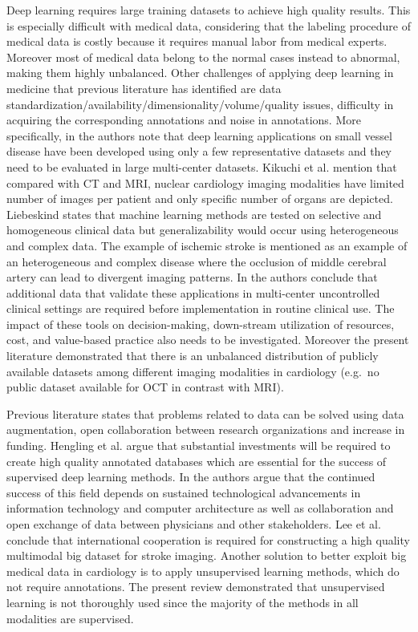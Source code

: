 \documentclass[journal]{IEEEtran}
\begin{document}
Deep learning requires large training datasets to achieve high quality results\cite{krizhevsky2012imagenet}.
This is especially difficult with medical data, considering that the labeling procedure of medical data is costly because it requires manual labor from medical experts.
Moreover most of medical data belong to the normal cases instead to abnormal, making them highly unbalanced.
Other challenges of applying deep learning in medicine that previous literature has identified are data standardization/availability/dimensionality/volume/quality issues, difficulty in acquiring the corresponding annotations and noise in annotations\cite{litjens2017survey, greenspan2016guest, miotto2017deep, slomka2017cardiac}.
More specifically, in\cite{blair2017advanced} the authors note that deep learning applications on small vessel disease have been developed using only a few representative datasets and they need to be evaluated in large multi-center datasets.
Kikuchi et al.\cite{kikuchi2018future} mention that compared with CT and MRI, nuclear cardiology imaging modalities have limited number of images per patient and only specific number of organs are depicted.
Liebeskind\cite{liebeskind2018artificial} states that machine learning methods are tested on selective and homogeneous clinical data but generalizability would occur using heterogeneous and complex data.
The example of ischemic stroke is mentioned as an example of an heterogeneous and complex disease where the occlusion of middle cerebral artery can lead to divergent imaging patterns.
In\cite{gomez2018new} the authors conclude that additional data that validate these applications in multi-center uncontrolled clinical settings are required before implementation in routine clinical use.
The impact of these tools on decision-making, down-stream utilization of resources, cost, and value-based practice also needs to be investigated.
Moreover the present literature demonstrated that there is an unbalanced distribution of publicly available datasets among different imaging modalities in cardiology (e.g.\ no public dataset available for OCT in contrast with MRI).

Previous literature states that problems related to data can be solved using data augmentation, open collaboration between research organizations and increase in funding.
Hengling et al.\cite{henglin2017machine} argue that substantial investments will be required to create high quality annotated databases which are essential for the success of supervised deep learning methods.
In\cite{austin2016application} the authors argue that the continued success of this field depends on sustained technological advancements in information technology and computer architecture as well as collaboration and open exchange of data between physicians and other stakeholders.
Lee et al.\cite{lee2017deepb} conclude that international cooperation is required for constructing a high quality multimodal big dataset for stroke imaging.
Another solution to better exploit big medical data in cardiology is to apply unsupervised learning methods, which do not require annotations.
The present review demonstrated that unsupervised learning is not thoroughly used since the majority of the methods in all modalities are supervised.
\end{document}
